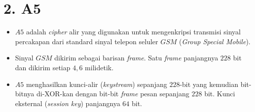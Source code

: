 \documentclass{article}
\begin{document}

\section*{2. A5}

\begin{itemize}
    \item $A5$ adalah \textit{cipher} alir yang digunakan untuk mengenkripsi transmisi sinyal percakapan dari standard sinyal telepon seluler $GSM$ (\textit{Group Special Mobile}).
    \item Sinyal $GSM$ dikirim sebagai barisan \textit{frame}. Satu \textit{frame} panjangnya $228$ bit dan dikirim setiap $4,6$ milidetik.
    \item $A5$ menghasilkan kunci-alir (\textit{keystream}) sepanjang $228$-bit yang kemudian bit-bitnya di-XOR-kan dengan bit-bit \textit{frame} pesan sepanjang $228$ bit. Kunci eksternal (\textit{session key}) panjangnya $64$ bit.
\end{itemize}
\end{document}
